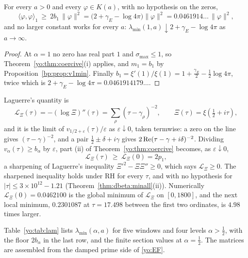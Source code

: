 \begin{corollary}\label{yo:cor:half}
For every $a>0$ and every $\varphi\in K(a)$, with no hypothesis on the zeros,
\[
\langle\varphi,\varphi\rangle_1\ \ge\ 2b_1\,\|\varphi\|^2=\bigl(2+\gamma_E-\log4\pi\bigr)\|\varphi\|^2=0.0461914\ldots\,\|\varphi\|^2,
\]
and no larger constant works for every $a$: $\lambda_{\min}(1,a)\downarrow2+\gamma_E-\log4\pi$ as $a\to\infty$.
\end{corollary}

\begin{proof}
At $\alpha=1$ no zero has real part $1$ and $\sigma_{\max}\le1$, so Theorem~\ref{yo:thm:coercive}(i) applies, and $m_1=b_1$ by Proposition~\ref{bp:prop:v1min}. Finally $b_1=\xi'(1)/\xi(1)=1+\frac{\gamma_E}2-\frac12\log4\pi$, twice which is $2+\gamma_E-\log4\pi=0.0461914179\ldots$.
\end{proof}

\begin{remark}\label{yo:rem:laguerre}
Laguerre's quantity is
\[
\mathcal L_\Xi(\tau)=-(\log\Xi)''(\tau)=\sum_\rho(\tau-\gamma_\rho)^{-2},\qquad\Xi(\tau)=\xi(\tfrac12+i\tau),
\]
and it is the limit of $v_{1/2+\varepsilon}(\tau)/\varepsilon$ as $\varepsilon\downarrow0$, taken termwise: a zero on the line gives $(\tau-\gamma)^{-2}$, and a pair $\frac12\pm\delta+i\gamma$ gives $2\operatorname{Re}(\tau-\gamma+i\delta)^{-2}$. Dividing $v_\alpha(\tau)\ge b_\alpha$ by $\varepsilon$, part (ii) of Theorem~\ref{yo:thm:coercive} becomes, as $\varepsilon\downarrow0$,
\[
\mathcal L_\Xi(\tau)\ \ge\ \mathcal L_\Xi(0)=2p_1,
\]
a sharpening of Laguerre's inequality $\Xi'^2-\Xi\Xi''\ge0$, which says $\mathcal L_\Xi\ge0$. The sharpened inequality holds under RH for every $\tau$, and with no hypothesis for $|\tau|\le3\times10^{12}-1.21$ (Theorem~\ref{thm:dbeta:minall}(ii)). Numerically $\mathcal L_\Xi(0)=0.0462100$ is the global minimum of $\mathcal L_\Xi$ on $[0,1800]$, and the next local minimum, $0.2301087$ at $\tau=17.498$ between the first two ordinates, is $4.98$ times larger.
\end{remark}

Table~\ref{yo:tab:lam} lists $\lambda_{\min}(\alpha,a)$ for five windows and four levels $\alpha>\frac12$, with the floor $2b_\alpha$ in the last row, and the finite section values at $\alpha=\frac12$. The matrices are assembled from the damped prime side of \eqref{yo:EF}.

